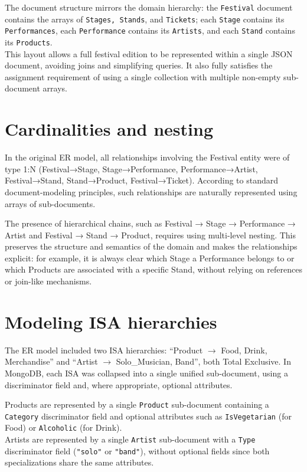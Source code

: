 \documentclass[11pt,a4paper]{report}
\begin{document}
The document structure mirrors the domain hierarchy: the \texttt{Festival} document contains the arrays of \texttt{Stages, Stands}, and \texttt{Tickets}; each \texttt{Stage} contains its \texttt{Performances}, each \texttt{Performance} contains its \texttt{Artists}, and each \texttt{Stand} contains its \texttt{Products}.\\
This layout allows a full festival edition to be represented within a single JSON document, avoiding joins and simplifying queries. It also fully satisfies the assignment requirement of using a single collection with multiple non-empty sub-document arrays.

\section{Cardinalities and nesting}

In the original ER model, all relationships involving the Festival entity were of type 1:N (Festival→Stage, Stage→Performance, Performance→Artist, Festival→Stand, Stand→Product, Festival→Ticket). According to standard document-modeling principles, such relationships are naturally represented using arrays of sub-documents.

The presence of hierarchical chains, such as Festival → Stage → Performance → Artist and Festival → Stand → Product, requires using multi-level nesting. This preserves the structure and semantics of the domain and makes the relationships explicit: for example, it is always clear which Stage a Performance belongs to or which Products are associated with a specific Stand, without relying on references or join-like mechanisms.

\section{Modeling ISA hierarchies}

The ER model included two ISA hierarchies: ``Product $\rightarrow$ Food, Drink, Merchandise'' and ``Artist $\rightarrow$ Solo\_Musician, Band'', both Total Exclusive.
In MongoDB, each ISA was collapsed into a single unified sub-document, using a discriminator field and, where appropriate, optional attributes.

Products are represented by a single \texttt{Product} sub-document containing a \texttt{Category} discriminator field and optional attributes such as \texttt{IsVegetarian} (for Food) or \texttt{Alcoholic} (for Drink).\\
Artists are represented by a single \texttt{Artist} sub-document with a \texttt{Type} discriminator field (\texttt{"solo"} or \texttt{"band"}), without optional fields since both specializations share the same attributes.
\end{document}
